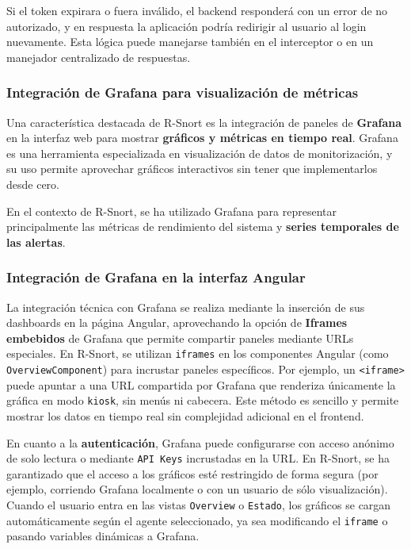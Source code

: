\documentclass[11pt,a4paper,twoside]{report}
\begin{document}
Si el token expirara o fuera inválido, el backend responderá con un error de no autorizado, y en respuesta la aplicación podría redirigir al usuario al login nuevamente. Esta lógica puede manejarse también en el interceptor o en un manejador centralizado de respuestas.

\subsubsection{Integración de Grafana para visualización de métricas}

Una característica destacada de R-Snort es la integración de paneles de \textbf{Grafana} en la interfaz web para mostrar \textbf{gráficos y métricas en tiempo real}. Grafana es una herramienta especializada en visualización de datos de monitorización, y su uso permite aprovechar gráficos interactivos sin tener que implementarlos desde cero.\newline

En el contexto de R-Snort, se ha utilizado Grafana para representar principalmente las métricas de rendimiento del sistema y \textbf{series temporales de las alertas}.

\subsubsection{Integración de Grafana en la interfaz Angular}

La integración técnica con Grafana se realiza mediante la inserción de sus dashboards en la página Angular, aprovechando la opción de \textbf{Iframes embebidos} de Grafana que permite compartir paneles mediante URLs especiales. En R-Snort, se utilizan \texttt{iframes} en los componentes Angular (como \texttt{OverviewComponent}) para incrustar paneles específicos. Por ejemplo, un \texttt{<iframe>} puede apuntar a una URL compartida por Grafana que renderiza únicamente la gráfica en modo \texttt{kiosk}, sin menús ni cabecera. Este método es sencillo y permite mostrar los datos en tiempo real sin complejidad adicional en el frontend.\newline

En cuanto a la \textbf{autenticación}, Grafana puede configurarse con acceso anónimo de solo lectura o mediante \texttt{API Keys} incrustadas en la URL. En R-Snort, se ha garantizado que el acceso a los gráficos esté restringido de forma segura (por ejemplo, corriendo Grafana localmente o con un usuario de sólo visualización). Cuando el usuario entra en las vistas \texttt{Overview} o \texttt{Estado}, los gráficos se cargan automáticamente según el agente seleccionado, ya sea modificando el \texttt{iframe} o pasando variables dinámicas a Grafana.\newline
\end{document}

